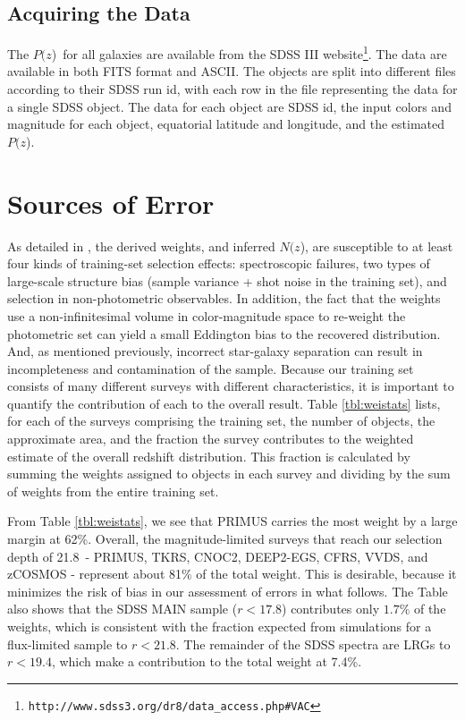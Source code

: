 \documentclass[12pt,preprint]{aastex}
\newcommand{\rmax}{21.8}
\newcommand{\pofz}{$P(z$)}
\newcommand{\nofz}{$N(z$)}
\newcommand{\downloadURL}{{\tt http://www.sdss3.org/dr8/data\_access.php\#VAC}}
\begin{document}
\subsection{Acquiring the Data} \label{sec:get}

The \pofz\ for all galaxies are available from the SDSS III
website\footnote{\downloadURL}.  The data are available in both FITS format and
ASCII.  The objects are split into different files according to their SDSS run
id, with each row in the file representing the data for a single SDSS object.
The data for each object are SDSS id, the input colors and magnitude for each
object, equatorial latitude and longitude, and the estimated \pofz.



\section{Sources of Error} \label{sec:errors}

As detailed in \cite{CunhaPhotoz09}, the derived weights, and inferred \nofz,
are susceptible to at least four kinds of training-set selection effects:
spectroscopic failures, two types of large-scale structure bias (sample variance + shot
noise in the training set), and selection in non-photometric observables.  In
addition, the fact that the weights use a non-infinitesimal volume in color-magnitude
space to re-weight the photometric set can yield a small Eddington bias to the
recovered distribution.  And, as mentioned previously, incorrect star-galaxy
separation can result in incompleteness and contamination of the sample.
Because our training set consists of many different surveys with different
characteristics, it is important to quantify the contribution of each to the
overall result.  Table \ref{tbl:weistats} lists, for each of the surveys
comprising the training set, the number of objects, the approximate area, and
the fraction the survey contributes to the weighted estimate of the overall
redshift distribution.  This fraction is calculated by summing the weights
assigned to objects in each survey and dividing by the sum of weights from the
entire training set.


From Table \ref{tbl:weistats}, we see that PRIMUS carries the most weight by a
large margin at 62\%.  Overall, the magnitude-limited surveys that reach our
selection depth of \rmax\ - PRIMUS, TKRS, CNOC2, DEEP2-EGS, CFRS, VVDS, and
zCOSMOS - represent about 81$\%$ of the total weight.  
This is desirable,
because it minimizes the risk of bias in our assessment of errors in what follows.
The Table also shows that the SDSS MAIN sample ($r<17.8$) contributes only $1.7\%$ of the weights, which
is consistent with the fraction expected from simulations for a flux-limited sample 
to $r<21.8$.
The remainder of the SDSS spectra are LRGs to $r<19.4$, which make a 
contribution to the total weight at 7.4\%.
\end{document}
